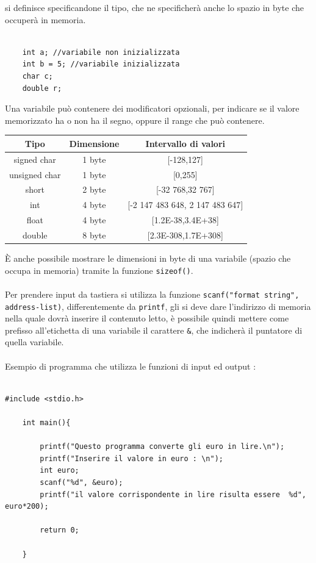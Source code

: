 \documentclass[12pt, letterpaper]{article}
\newcommand{\code}[1]{\colorbox{light-gray}{\texttt{#1}}}
\newcommand{\acc}{\\\hphantom{}\\}
\begin{document}
si definisce specificandone il tipo, che ne specificherà anche lo spazio in byte che occuperà in memoria. 
\begin{lstlisting}[style=CStyle]
    
    int a; //variabile non inizializzata
    int b = 5; //variabile inizializzata
    char c;
    double r;
    \end{lstlisting}
Una variabile può contenere dei modificatori opzionali, per indicare se il valore memorizzato ha o non ha il segno, 
oppure il range che può contenere.\begin{center}
    \begin{tabular}{|c|c|c|}
        \hline
        \rowcolor[HTML]{C0C0C0} 
        Tipo          & Dimensione & Intervallo di valori                \\ \hline
        signed char   & 1 byte     & {[}-128,127{]}                      \\ \hline
        unsigned char & 1 byte     & {[}0,255{]}                         \\ \hline
        short         & 2 byte     & {[}-32 768,32 767{]}                \\ \hline
        int           & 4 byte     & {[}-2 147 483 648, 2 147 483 647{]} \\ \hline
        float         & 4 byte     & {[}1.2E-38,3.4E+38{]}               \\ \hline
        double        & 8 byte     & {[}2.3E-308,1.7E+308{]}             \\ \hline
        \end{tabular}
\end{center}
È anche possibile mostrare le dimensioni in byte di una variabile (spazio che occupa in memoria) tramite la 
funzione \code{sizeof()}.\acc 
Per prendere input da tastiera si utilizza la funzione \code{scanf("format string", address-list)}, differentemente 
da \code{printf}, gli si deve dare l'indirizzo di memoria nella quale dovrà inserire il contenuto letto, è possibile quindi 
mettere come prefisso all'etichetta di una variabile il carattere \code{\&}, che indicherà il puntatore di quella variabile.\acc 
Esempio di programma che utilizza le funzioni di input ed output :
\begin{lstlisting}[style=CStyle]

#include <stdio.h>

    int main(){

        printf("Questo programma converte gli euro in lire.\n");
        printf("Inserire il valore in euro : \n");
        int euro;
        scanf("%d", &euro);
        printf("il valore corrispondente in lire risulta essere  %d", euro*200); 

        return 0;

    }
    \end{lstlisting}
\newpage 
\end{document}
